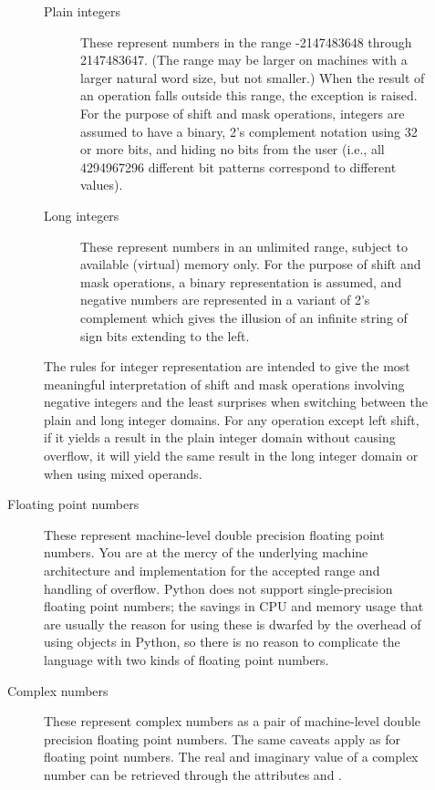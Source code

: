 \begin{description}
\begin{description}
\begin{description}
\item[Plain integers]
These represent numbers in the range -2147483648 through 2147483647.
(The range may be larger on machines with a larger natural word
size, but not smaller.)
When the result of an operation falls outside this range, the
exception  is raised.
For the purpose of shift and mask operations, integers are assumed to
have a binary, 2's complement notation using 32 or more bits, and
hiding no bits from the user (i.e., all 4294967296 different bit
patterns correspond to different values).

\item[Long integers]
These represent numbers in an unlimited range, subject to available
(virtual) memory only.  For the purpose of shift and mask operations,
a binary representation is assumed, and negative numbers are
represented in a variant of 2's complement which gives the illusion of
an infinite string of sign bits extending to the left.

\end{description} %

The rules for integer representation are intended to give the most
meaningful interpretation of shift and mask operations involving
negative integers and the least surprises when switching between the
plain and long integer domains.  For any operation except left shift,
if it yields a result in the plain integer domain without causing
overflow, it will yield the same result in the long integer domain or
when using mixed operands.

\item[Floating point numbers]
These represent machine-level double precision floating point numbers.  
You are at the mercy of the underlying machine architecture and
\C{} implementation for the accepted range and handling of overflow.
Python does not support single-precision floating point numbers; the
savings in CPU and memory usage that are usually the reason for using
these is dwarfed by the overhead of using objects in Python, so there
is no reason to complicate the language with two kinds of floating
point numbers.

\item[Complex numbers]
These represent complex numbers as a pair of machine-level double
precision floating point numbers.  The same caveats apply as for
floating point numbers.  The real and imaginary value of a complex
number  can be retrieved through the attributes 
and .


\end{description}
\end{description}
